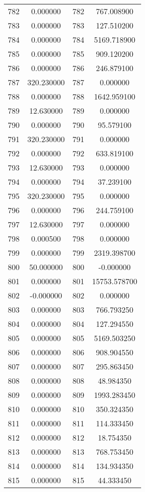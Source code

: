 \documentclass[12pt]{article}
\begin{document}
\begin{longtable}{@{}cccc@{}}
782 & 0.000000 & 782 & 767.008900 \\
783 & 0.000000 & 783 & 127.510200 \\
784 & 0.000000 & 784 & 5169.718900 \\
785 & 0.000000 & 785 & 909.120200 \\
786 & 0.000000 & 786 & 246.879100 \\
787 & 320.230000 & 787 & 0.000000 \\
788 & 0.000000 & 788 & 1642.959100 \\
789 & 12.630000 & 789 & 0.000000 \\
790 & 0.000000 & 790 & 95.579100 \\
791 & 320.230000 & 791 & 0.000000 \\
792 & 0.000000 & 792 & 633.819100 \\
793 & 12.630000 & 793 & 0.000000 \\
794 & 0.000000 & 794 & 37.239100 \\
795 & 320.230000 & 795 & 0.000000 \\
796 & 0.000000 & 796 & 244.759100 \\
797 & 12.630000 & 797 & 0.000000 \\
798 & 0.000500 & 798 & 0.000000 \\
799 & 0.000000 & 799 & 2319.398700 \\
800 & 50.000000 & 800 & -0.000000 \\
801 & 0.000000 & 801 & 15753.578700 \\
802 & -0.000000 & 802 & 0.000000 \\
803 & 0.000000 & 803 & 766.793250 \\
804 & 0.000000 & 804 & 127.294550 \\
805 & 0.000000 & 805 & 5169.503250 \\
806 & 0.000000 & 806 & 908.904550 \\
807 & 0.000000 & 807 & 295.863450 \\
808 & 0.000000 & 808 & 48.984350 \\
809 & 0.000000 & 809 & 1993.283450 \\
810 & 0.000000 & 810 & 350.324350 \\
811 & 0.000000 & 811 & 114.333450 \\
812 & 0.000000 & 812 & 18.754350 \\
813 & 0.000000 & 813 & 768.753450 \\
814 & 0.000000 & 814 & 134.934350 \\
815 & 0.000000 & 815 & 44.333450 \\

\end{longtable}
\end{document}

